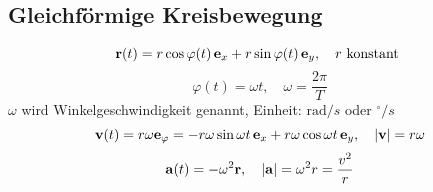 \subsection{Gleichförmige Kreisbewegung}
\begin{equation}
\mathbf{r}(t) = r \cos\varphi (t) \, \mathbf{e}_{x} + r \sin \varphi (t) \, \mathbf{e}_{y},\quad r \text{ konstant }
\end{equation}
\begin{equation}
\varphi(t) = \omega t, \quad \omega = \dfrac{2\pi}{T} 
\end{equation}
$\omega$ wird Winkelgeschwindigkeit genannt, Einheit: $\mathrm{rad} / s$ oder $ {}^{\circ} / s$
\begin{equation}
\mathbf{v}(t) = r \omega \mathbf{e}_{\varphi} = - r \omega \sin \omega t \, \mathbf{e}_{x} + r \omega \cos \omega t \, \mathbf{e}_{y} , \quad \mathbf{\left| v \right|} = r \omega
\end{equation}
\begin{equation}
\mathbf{a}(t) = - \omega ^2 \mathbf{r}, \quad \mathbf{\left| a \right|} = \omega ^2 r = \dfrac{v^2}{r}
\end{equation}